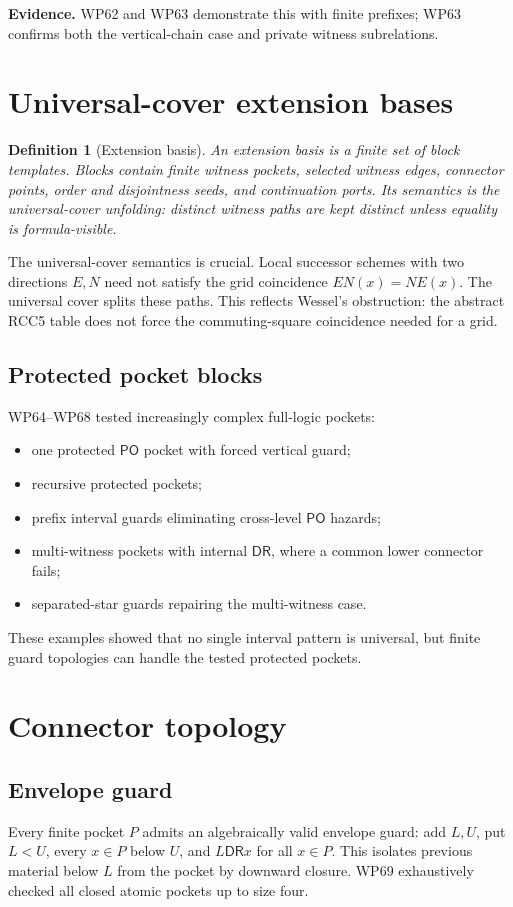 \documentclass[11pt]{article}
\newtheorem{definition}[theorem]{Definition}
\newcommand{\PO}{\mathsf{PO}}
\newcommand{\DR}{\mathsf{DR}}
\begin{document}
\noindent\textbf{Evidence.} WP62 and WP63 demonstrate this with finite prefixes; WP63 confirms both the vertical-chain case and private witness subrelations.

\section{Universal-cover extension bases}

\begin{definition}[Extension basis]
An extension basis is a finite set of block templates.  Blocks contain finite witness pockets, selected witness edges, connector points, order and disjointness seeds, and continuation ports.  Its semantics is the universal-cover unfolding: distinct witness paths are kept distinct unless equality is formula-visible.
\end{definition}

The universal-cover semantics is crucial.  Local successor schemes with two directions $E,N$ need not satisfy the grid coincidence $EN(x)=NE(x)$.  The universal cover splits these paths.  This reflects Wessel's obstruction: the abstract RCC5 table does not force the commuting-square coincidence needed for a grid.

\subsection{Protected pocket blocks}
WP64--WP68 tested increasingly complex full-logic pockets:
\begin{itemize}
\item one protected $\PO$ pocket with forced vertical guard;
\item recursive protected pockets;
\item prefix interval guards eliminating cross-level $\PO$ hazards;
\item multi-witness pockets with internal $\DR$, where a common lower connector fails;
\item separated-star guards repairing the multi-witness case.
\end{itemize}
These examples showed that no single interval pattern is universal, but finite guard topologies can handle the tested protected pockets.

\section{Connector topology}

\subsection{Envelope guard}
Every finite pocket $P$ admits an algebraically valid envelope guard: add $L,U$, put $L<U$, every $x\in P$ below $U$, and $L\DR x$ for all $x\in P$.  This isolates previous material below $L$ from the pocket by downward closure.  WP69 exhaustively checked all closed atomic pockets up to size four.
\end{document}
